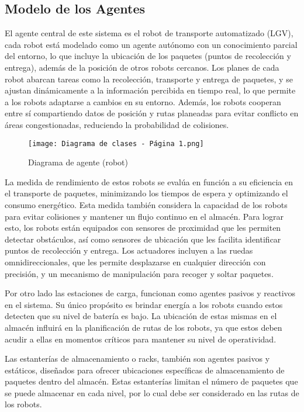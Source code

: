 \documentclass[sjournal]{IEEEtran}
\begin{document}
\subsection{Modelo de los Agentes}
El agente central de este sistema es el robot de transporte automatizado (LGV), cada robot está modelado como un agente autónomo con un conocimiento parcial del entorno, lo que incluye la ubicación de los paquetes (puntos de recolección y entrega), además de la posición de otros robots cercanos. Los planes de cada robot abarcan tareas como la recolección, transporte y entrega de paquetes, y se ajustan dinámicamente a la información percibida en tiempo real, lo que permite a los robots adaptarse a cambios en su entorno. Además, los robots cooperan entre sí compartiendo datos de posición y rutas planeadas para evitar conflicto en áreas congestionadas, reduciendo la probabilidad de colisiones.

\begin{figure}[h!]
    \centering
    \texttt{[image: Diagrama de clases - Página 1.png]}
    \caption{Diagrama de agente (robot)}
    \label{fig:etiqueta}
\end{figure}
La medida de rendimiento de estos robots se evalúa en función a su eficiencia en el transporte de paquetes, minimizando los tiempos de espera y optimizando el consumo energético. Esta medida también considera la capacidad de los robots para evitar colisiones y mantener un flujo continuo en el almacén. Para lograr esto, los robots están equipados con sensores de proximidad que les permiten detectar obstáculos, así como sensores de ubicación que les facilita identificar puntos de recolección y entrega. Los actuadores incluyen a las ruedas omnidireccionales, que les permite desplazarse en cualquier dirección con precisión, y un mecanismo de manipulación para recoger y soltar paquetes.

Por otro lado las estaciones de carga, funcionan como agentes pasivos y reactivos en el sistema. Su único propósito es brindar energía a los robots cuando estos detecten que su nivel de batería es bajo. La ubicación de estas mismas en el almacén influirá en la planificación de rutas de los robots, ya que estos deben acudir a ellas en momentos críticos para mantener su nivel de operatividad.

Las estanterías de almacenamiento o racks, también son agentes pasivos y estáticos, diseñados para ofrecer ubicaciones específicas de almacenamiento de paquetes dentro del almacén. Estas estanterías limitan el número de paquetes que se puede almacenar en cada nivel, por lo cual debe ser considerado en las rutas de los robots.
\end{document}
